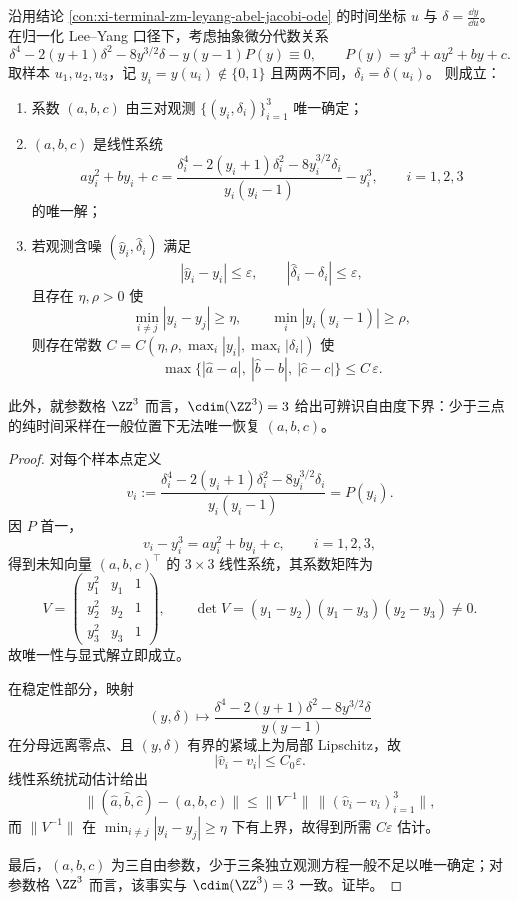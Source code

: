 \begin{theorem}\label{thm:conclusion-leyang-time-identifiability-three-sampling}
沿用结论 \ref{con:xi-terminal-zm-leyang-abel-jacobi-ode} 的时间坐标 \(u\) 与 \(\delta=\frac{\dd y}{\dd u}\)。
在归一化 Lee--Yang 口径下，考虑抽象微分代数关系
\[
\delta^4-2(y+1)\delta^2-8y^{3/2}\delta-y(y-1)P(y)\equiv 0,
\qquad
P(y)=y^3+ay^2+by+c.
\]
取样本 \(u_1,u_2,u_3\)，记 \(y_i=y(u_i)\notin\{0,1\}\) 且两两不同，\(\delta_i=\delta(u_i)\)。
则成立：
\begin{enumerate}
  \item 系数 \((a,b,c)\) 由三对观测 \(\{(y_i,\delta_i)\}_{i=1}^3\) 唯一确定；
  \item \((a,b,c)\) 是线性系统
  \[
  a y_i^2+b y_i+c
  =
  \frac{\delta_i^4-2(y_i+1)\delta_i^2-8y_i^{3/2}\delta_i}{y_i(y_i-1)}-y_i^3,
  \qquad i=1,2,3
  \]
  的唯一解；
  \item 若观测含噪 \((\widehat y_i,\widehat\delta_i)\) 满足
  \[
  |\widehat y_i-y_i|\le\varepsilon,\qquad
  |\widehat\delta_i-\delta_i|\le\varepsilon,
  \]
  且存在 \(\eta,\rho>0\) 使
  \[
  \min_{i\ne j}|y_i-y_j|\ge\eta,\qquad
  \min_i |y_i(y_i-1)|\ge\rho,
  \]
  则存在常数 \(C=C(\eta,\rho,\max_i|y_i|,\max_i|\delta_i|)\) 使
  \[
  \max\{|\widehat a-a|,\ |\widehat b-b|,\ |\widehat c-c|\}\le C\,\varepsilon.
  \]
\end{enumerate}
此外，就参数格 \(\ZZ^3\) 而言，\(\cdim(\ZZ^3)=3\) 给出可辨识自由度下界：少于三点的纯时间采样在一般位置下无法唯一恢复 \((a,b,c)\)。
\end{theorem}
\begin{proof}
对每个样本点定义
\[
v_i:=
\frac{\delta_i^4-2(y_i+1)\delta_i^2-8y_i^{3/2}\delta_i}{y_i(y_i-1)}
=P(y_i).
\]
因 \(P\) 首一，
\[
v_i-y_i^3=a y_i^2+b y_i+c,\qquad i=1,2,3,
\]
得到未知向量 \((a,b,c)^\top\) 的 \(3\times 3\) 线性系统，其系数矩阵为
\[
V=
\begin{pmatrix}
y_1^2&y_1&1\\
y_2^2&y_2&1\\
y_3^2&y_3&1
\end{pmatrix},
\qquad
\det V=(y_1-y_2)(y_1-y_3)(y_2-y_3)\neq 0.
\]
故唯一性与显式解立即成立。

在稳定性部分，映射
\[
(y,\delta)\longmapsto
\frac{\delta^4-2(y+1)\delta^2-8y^{3/2}\delta}{y(y-1)}
\]
在分母远离零点、且 \((y,\delta)\) 有界的紧域上为局部 Lipschitz，故
\[
|\widehat v_i-v_i|\le C_0\varepsilon.
\]
线性系统扰动估计给出
\[
\|(\widehat a,\widehat b,\widehat c)-(a,b,c)\|
\le \|V^{-1}\|\,\|(\widehat v_i-v_i)_{i=1}^3\|,
\]
而 \(\|V^{-1}\|\) 在 \(\min_{i\ne j}|y_i-y_j|\ge\eta\) 下有上界，故得到所需 \(C\varepsilon\) 估计。

最后，\((a,b,c)\) 为三自由参数，少于三条独立观测方程一般不足以唯一确定；对参数格 \(\ZZ^3\) 而言，该事实与 \(\cdim(\ZZ^3)=3\) 一致。证毕。
\end{proof}


